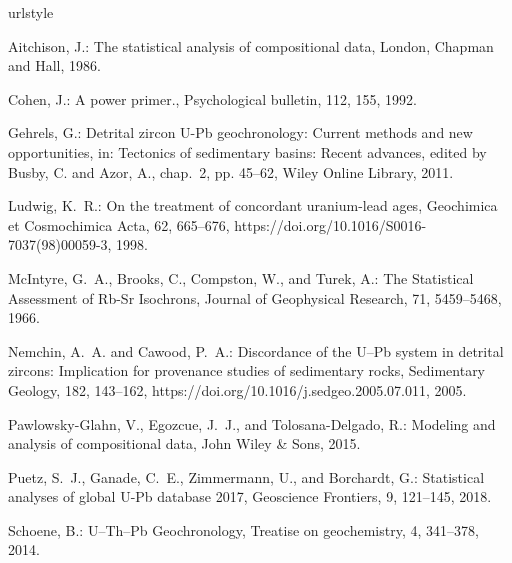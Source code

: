 \documentclass[gchron, manuscript]{copernicus}
\begin{document}
\begin{thebibliography}{14}
\providecommand{\natexlab}[1]{#1}
\providecommand{\url}[1]{{\tt #1}}
\providecommand{\urlprefix}{URL }
\expandafter\ifx\csname urlstyle\endcsname\relax
  \providecommand{\doi}[1]{https://doi.org/\discretionary{}{}{}#1}\else
  \providecommand{\doi}{https://doi.org/\discretionary{}{}{}\begingroup
  \urlstyle{rm}\Url}\fi

Aitchison, J.: The statistical analysis of compositional data, London, Chapman
  and Hall, 1986.

Cohen, J.: A power primer., Psychological bulletin, 112, 155, 1992.

Gehrels, G.: {Detrital zircon U-Pb geochronology: Current methods and new
  opportunities}, in: Tectonics of sedimentary basins: Recent advances, edited
  by Busby, C. and Azor, A., chap.~2, pp. 45--62, Wiley Online Library, 2011.

{Ludwig}, K.~R.: {On the treatment of concordant uranium-lead ages}, Geochimica
  et Cosmochimica Acta, 62, 665--676, \doi{10.1016/S0016-7037(98)00059-3},
  1998.

{McIntyre}, G.~A., {Brooks}, C., {Compston}, W., and {Turek}, A.: {The
  Statistical Assessment of Rb-Sr Isochrons}, Journal of Geophysical Research,
  71, 5459--5468, 1966.

{Nemchin}, A.~A. and {Cawood}, P.~A.: {Discordance of the U--Pb system in
  detrital zircons: Implication for provenance studies of sedimentary rocks},
  Sedimentary Geology, 182, 143--162, \doi{10.1016/j.sedgeo.2005.07.011}, 2005.

Pawlowsky-Glahn, V., Egozcue, J.~J., and Tolosana-Delgado, R.: Modeling and
  analysis of compositional data, John Wiley \& Sons, 2015.

Puetz, S.~J., Ganade, C.~E., Zimmermann, U., and Borchardt, G.: {Statistical
  analyses of global U-Pb database 2017}, Geoscience Frontiers, 9, 121--145,
  2018.

Schoene, B.: U--Th--Pb Geochronology, Treatise on geochemistry, 4, 341--378,
  2014.


\end{thebibliography}
\end{document}
